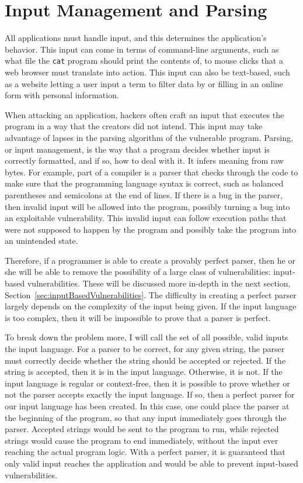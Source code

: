 \section{Input Management and Parsing}
\label{sec:inputManagement}
All applications must handle input, and this determines the application's behavior.  This input can come in terms of command-line arguments, such as what file the \texttt{cat} program should print the contents of, to mouse clicks that a web browser must translate into action.  This input can also be text-based, such as a website letting a user input a term to filter data by or filling in an online form with personal information.

When attacking an application, hackers often craft an input that executes the program in a way that the creators did not intend.  This input may take advantage of lapses in the parsing algorithm of the vulnerable program.  Parsing, or input management, is the way that a program decides whether input is correctly formatted, and if so, how to deal with it.  It infers meaning from raw bytes.  For example, part of a compiler is a parser that checks through the code to make sure that the programming language syntax is correct, such as balanced parentheses and semicolons at the end of lines.  If there is a bug in the parser, then invalid input will be allowed into the program, possibly turning a bug into an exploitable vulnerability.  This invalid input can follow execution paths that were not supposed to happen by the program and possibly take the program into an unintended state.

Therefore, if a programmer is able to create a provably perfect parser, then he or she will be able to remove the possibility of a large class of vulnerabilities: input-based vulnerabilities.  These will be discussed more in-depth in the next section, Section~\ref{sec:inputBasedVulnerabilities}.  The difficulty in creating a perfect parser largely depends on the complexity of the input being given.  If the input language is too complex, then it will be impossible to prove that a parser is perfect.

To break down the problem more, I will call the set of all possible, valid inputs the input language.  For a parser to be correct, for any given string, the parser must correctly decide whether the string should be accepted or rejected.  If the string is accepted, then it is in the input language.  Otherwise, it is not.  If the input language is regular or context-free, then it is possible to prove whether or not the parser accepts exactly the input language.  If so, then a perfect parser for our input language has been created.  In this case, one could place the parser at the beginning of the program, so that any input immediately goes through the parser.  Accepted strings would be sent to the program to run, while rejected strings would cause the program to end immediately, without the input ever reaching the actual program logic.  With a perfect parser, it is guaranteed that only valid input reaches the application and would be able to prevent input-based vulnerabilities.


